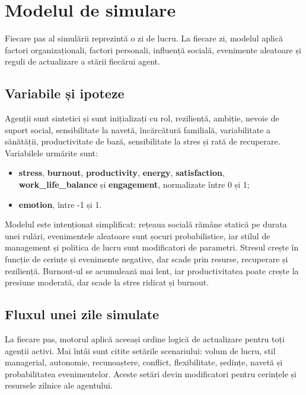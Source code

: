 \documentclass[12pt,a4paper]{article}
\begin{document}
\clearpage
\section{Modelul de simulare}

Fiecare pas al simulării reprezintă o zi de lucru. La fiecare zi, modelul aplică factori organizaționali, factori personali, influență socială, evenimente aleatoare și reguli de actualizare a stării fiecărui agent.

\subsection{Variabile și ipoteze}

Agenții sunt sintetici și sunt inițializați cu rol, reziliență, ambiție, nevoie de suport social, sensibilitate la navetă, încărcătură familială, variabilitate a sănătății, productivitate de bază, sensibilitate la stres și rată de recuperare. Variabilele urmărite sunt:

\begin{itemize}
    \item \textbf{stress}, \textbf{burnout}, \textbf{productivity}, \textbf{energy}, \textbf{satisfaction}, \textbf{work\_life\_balance} și \textbf{engagement}, normalizate între 0 și 1;
    \item \textbf{emotion}, între -1 și 1.
\end{itemize}

Modelul este intenționat simplificat: rețeaua socială rămâne statică pe durata unei rulări, evenimentele aleatoare sunt șocuri probabilistice, iar stilul de management și politica de lucru sunt modificatori de parametri. Stresul crește în funcție de cerințe și evenimente negative, dar scade prin resurse, recuperare și reziliență. Burnout-ul se acumulează mai lent, iar productivitatea poate crește la presiune moderată, dar scade la stres ridicat și burnout.

\vspace{0.4cm}
\subsection{Fluxul unei zile simulate}

La fiecare pas, motorul aplică aceeași ordine logică de actualizare pentru toți agenții activi. Mai întâi sunt citite setările scenariului: volum de lucru, stil managerial, autonomie, recunoaștere, conflict, flexibilitate, ședințe, navetă și probabilitatea evenimentelor. Aceste setări devin modificatori pentru cerințele și resursele zilnice ale agentului.
\end{document}
